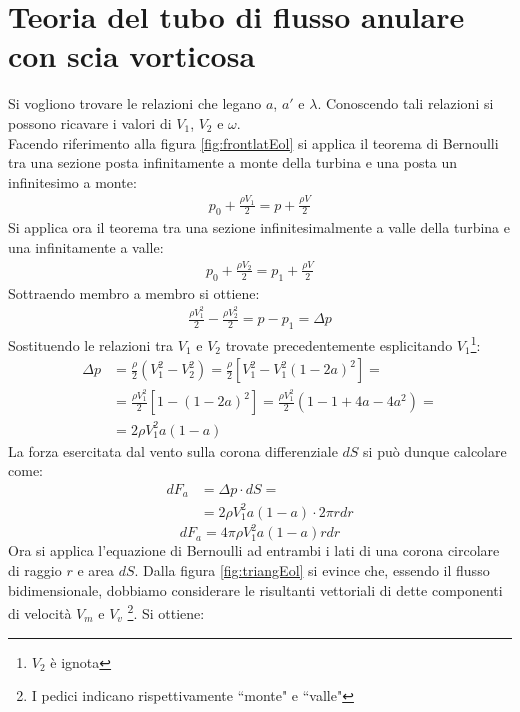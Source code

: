 \section{Teoria del tubo di flusso anulare con scia vorticosa}
Si vogliono trovare le relazioni che legano $a$, $a'$ e $\lambda$. Conoscendo tali relazioni si possono ricavare i valori di $V_1$, $V_2$ e $\omega$.\\
Facendo riferimento alla figura \ref{fig:frontlatEol} si applica il teorema di Bernoulli tra una sezione posta infinitamente a monte della turbina e una posta un infinitesimo a monte:
\begin{align*}
p_0 + \frac{\rho V_1}{2} = p + \frac{\rho V}{2}
\end{align*}
Si applica ora il teorema tra una sezione infinitesimalmente a valle della turbina e una infinitamente a valle:
\begin{align*}
p_0 + \frac{\rho V_2}{2} = p_1 + \frac{\rho V}{2}
\end{align*}
Sottraendo membro a membro si ottiene:
\begin{align*}
\frac{\rho V_1^2}{2} - \frac{\rho V_2^2}{2} = p - p_1 = \Delta p
\end{align*}
Sostituendo le relazioni tra $V_1$ e $V_2$ trovate precedentemente esplicitando $V_1$\footnote{$V_2$ è ignota}:
\begin{align*}
\Delta p &= \frac{\rho}{2} \left(V_1^2 - V_2^2 \right) = \frac{\rho}{2} \left[ V_1^2 - V_1^2 \left(1-2a \right)^2 \right]=\\
&= \frac{\rho V_1^2}{2} \left[ 1- \left( 1- 2a \right)^2 \right] = \frac{\rho V_1^2}{2} \left( 1- 1+4a-4a^2 \right)=\\
&= 2 \rho V_1^2 a \left( 1-a \right)
\end{align*}
La forza esercitata dal vento sulla corona differenziale $dS$ si può dunque calcolare come:
\begin{align*}
dF_a &= \Delta p \cdot dS = \\
&= 2 \rho V_1^2 a \left( 1-a \right) \cdot 2 \pi r dr
\end{align*}
\begin{equation}\label{eq:forza1}
dF_a = 4 \pi \rho	V_1^2 a \left( 1-a \right) r dr
\end{equation}
Ora si applica l'equazione di Bernoulli ad entrambi i lati di una corona circolare di raggio $r$ e area $dS$. Dalla figura \ref{fig:triangEol} si evince che, essendo il flusso bidimensionale, dobbiamo considerare le risultanti vettoriali di dette componenti di velocità $V_m$ e $V_v$ \footnote{I pedici indicano rispettivamente ``monte" e ``valle"}. Si ottiene:
